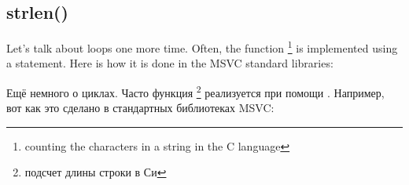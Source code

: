 ﻿\subsection{strlen()}

\ifdefined\ENGLISH
Let's talk about loops one more time. Often, the  
function
\footnote{counting the characters in a string in the C language} 
is implemented using a  statement.
Here is how it is done in the MSVC standard libraries:
\fi

\ifdefined\RUSSIAN
Ещё немного о циклах. Часто функция 
\footnote{подсчет длины строки в Си}
реализуется при помощи .
Например, вот как это сделано в стандартных библиотеках MSVC:
\fi

\ifdefined\GERMAN
\DEph{}
\fi



\EN{}
\RU{}
\DE{}

\EN{}
\RU{}
\DE{}
